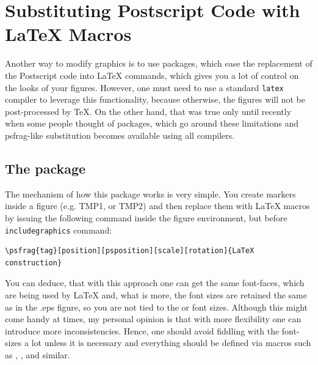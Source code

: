 \documentclass[
]{scrartcl}
\begin{document}
\section{Substituting Postscript Code with \LaTeX{} Macros}

%
Another way to modify graphics is to use packages, which ease the replacement of
    the Postscript code into \LaTeX{} commands, which gives you a lot of control
    on the looks of your figures.
%
However, one must need to use a standard \verb|latex| compiler to leverage this
    functionality, because otherwise, the  figures will not be
    post-processed by \TeX{}.
%
On the other hand, that was true only until recently when some people thought of
    packages, which go around these limitations and psfrag-like substitution
    becomes available using all compilers.


%
\subsection{The  package}

%
The mechanism of how this package works is very simple.
%
You create markers inside a  figure (e.g. TMP1, or TMP2) and then
    replace them with \LaTeX{} macros by issuing the following command inside
    the figure environment, but before \verb|includegraphics| command:
%
\begin{lstlisting}
\psfrag{tag}[position][psposition][scale][rotation]{LaTeX construction}
\end{lstlisting}

%
You can deduce, that with this approach one can get the same font-faces, which
    are being used by \LaTeX{} and, what is more, the font sizes are retained
    the same as in the .eps figure, so you are not tied to the 
    or  font sizes.
%
Although this might come handy at times, my personal opinion is that with more
    flexibility one can introduce more inconsistencies.
%
Hence, one should avoid fiddling with the font-sizes a lot unless it is
    necessary and everything should be defined via macros such as
    , ,  and similar.
\end{document}
